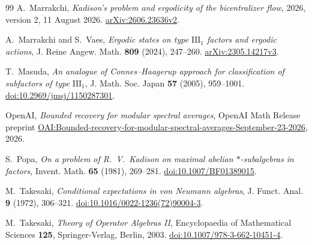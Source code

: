 \documentclass[11pt]{article}
\theoremstyle{definition}
\begin{document}
\begin{thebibliography}{99}
A.~Marrakchi, \emph{Kadison's problem and ergodicity of the bicentralizer flow},
2026, version 2, 11 August 2026.
\href{https://arxiv.org/abs/2606.23636v2}{arXiv:2606.23636v2}.

A.~Marrakchi and S.~Vaes, \emph{Ergodic states on type $\mathrm{III}_1$
factors and ergodic actions}, J. Reine Angew. Math. \textbf{809}
(2024), 247--260.
\href{https://arxiv.org/abs/2305.14217v3}{arXiv:2305.14217v3}.

T.~Masuda, \emph{An analogue of Connes--Haagerup approach for classification
of subfactors of type $\mathrm{III}_1$}, J. Math. Soc. Japan \textbf{57}
(2005), 959--1001.
\href{https://doi.org/10.2969/jmsj/1150287301}{doi:10.2969/jmsj/1150287301}.

OpenAI, \emph{Bounded recovery for modular spectral averages},
OpenAI Math Release preprint
\href{https://github.com/openai/math/blob/main/preprints/Bounded-recovery-for-modular-spectral-averages-September-23-2026/Bounded-recovery-for-modular-spectral-averages-September-23-2026.pdf}{OAI:Bounded-recovery-for-modular-spectral-averages-September-23-2026},
2026.

S.~Popa, \emph{On a problem of R.~V.~Kadison on maximal abelian
$*$-subalgebras in factors}, Invent. Math. \textbf{65} (1981), 269--281.
\href{https://doi.org/10.1007/BF01389015}{doi:10.1007/BF01389015}.

M.~Takesaki, \emph{Conditional expectations in von Neumann algebras},
J. Funct. Anal. \textbf{9} (1972), 306--321.
\href{https://doi.org/10.1016/0022-1236(72)90004-3}{doi:10.1016/0022-1236(72)90004-3}.

M.~Takesaki, \emph{Theory of Operator Algebras II}, Encyclopaedia of
Mathematical Sciences \textbf{125}, Springer-Verlag, Berlin, 2003.
\href{https://doi.org/10.1007/978-3-662-10451-4}{doi:10.1007/978-3-662-10451-4}.

\end{thebibliography}
\end{document}
